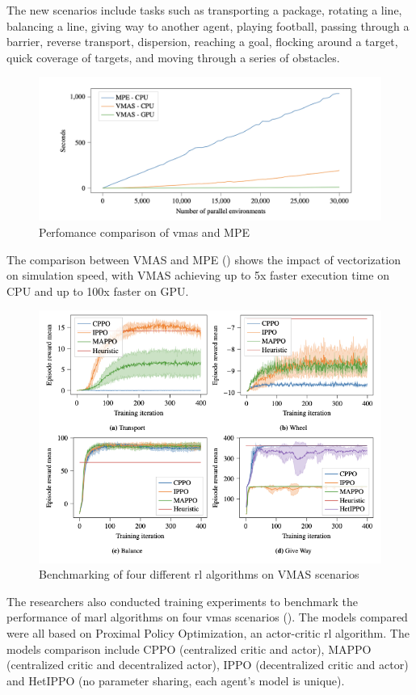 \documentclass[12pt,a4paper,openright,twoside]{book}
\begin{document}
The new scenarios include tasks such as transporting a package, rotating a line, balancing a line, giving way to another agent, playing football, passing through a barrier, reverse transport, dispersion, reaching a goal, flocking around a target, quick coverage of targets, and moving through a series of obstacles.
\begin{figure}[t]
    \centering
    \includegraphics[width=\textwidth]{img/vmasvsmpe.png}
    \caption{Perfomance comparison of \ac{vmas} and MPE}
    \label{fig:t}
\end{figure}
The comparison between VMAS and MPE () shows the impact of vectorization on simulation speed, with VMAS achieving up to 5x faster execution time on CPU and up to 100x faster on GPU.

\begin{figure}[t]
    \centering
    \includegraphics[width=\textwidth]{img/vmas4scen.png}
    \caption{Benchmarking of four different \ac{rl} algorithms on VMAS scenarios}
    \label{fig:s}
\end{figure}
The researchers also conducted training experiments to benchmark the performance of \ac{marl} algorithms on four \ac{vmas} scenarios (). The models compared were all based on Proximal Policy Optimization, an actor-critic \ac{rl} algorithm. The models comparison include CPPO (centralized critic and actor), MAPPO (centralized critic and decentralized actor), IPPO (decentralized critic and actor) and HetIPPO (no parameter sharing, each agent’s model is unique).
\end{document}
